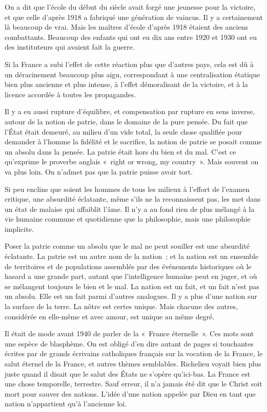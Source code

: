 \documentclass[french,twoside]{book} %
\begin{document}
On a dit que l'école du début du siècle avait forgé une jeunesse pour la victoire, et que celle d'après 1918 a fabriqué une génération de vaincus. Il y a certainement là beaucoup de vrai. Mais les maîtres d'école d'après 1918 étaient des anciens combattants. Beaucoup des enfants qui ont eu dix ans entre 1920 et 1930 ont eu des instituteurs qui avaient fait la guerre.\par
Si la France a subi l'effet de cette réaction plus que d'autres pays, cela est dû à un déracinement beaucoup plus aigu, correspondant à une centralisation étatique bien plus ancienne et plus intense, à l'effet démoralisant de la victoire, et à la licence accordée à toutes les propagandes.\par
Il y a eu aussi rupture d'équilibre, et compensation par rupture en sens inverse, autour de la notion de patrie, dans le domaine de la pure pensée. Du fait que l'État était demeuré, au milieu d'un vide total, la seule chose qualifiée pour demander à l'homme la fidélité et le sacrifice, la notion de patrie se posait comme un absolu dans la pensée. La patrie était hors du bien et du mal. C'est ce qu'exprime le proverbe anglais « right or wrong, my country ». Mais souvent on va plus loin. On n’admet pas que la patrie puisse avoir tort.\par
Si peu enclins que soient les hommes de tous les milieux à l'effort de l'examen critique, une absurdité éclatante, même s'ils ne la reconnaissent pas, les met dans un état de malaise qui affaiblit l'âme. Il n'y a au fond rien de plus mélangé à la vie humaine commune et quotidienne que la philosophie, mais une philosophie implicite.\par
Poser la patrie comme un absolu que le mal ne peut souiller est une absurdité éclatante. La patrie est un autre nom de la nation ; et la nation est un ensemble de territoires et de populations assemblés par des événements historiques où le hasard a une grande part, autant que l'intelligence humaine peut en juger, et où se mélangent toujours le bien et le mal. La nation est un fait, et un fait n'est pas un absolu. Elle est un fait parmi d'autres analogues. Il y a plus d'une nation sur la surface de la terre. La nôtre est certes unique. Mais chacune des autres, considérée en elle-même et avec amour, est unique au même degré.\par
Il était de mode avant 1940 de parler de la « France éternelle ». Ces mots sont une espèce de blasphème. On est obligé d'en dire autant de pages si touchantes écrites par de grands écrivains catholiques français sur la vocation de la France, le salut éternel de la France, et autres thèmes semblables. Richelieu voyait bien plus juste quand il disait que le salut des États ne s'opère qu’ici-bas. La France est une chose temporelle, terrestre. Sauf erreur, il n'a jamais été dit que le Christ soit mort pour sauver des nations. L'idée d'une nation appelée par Dieu en tant que nation n'appartient qu'à l'ancienne loi.\par
\end{document}
